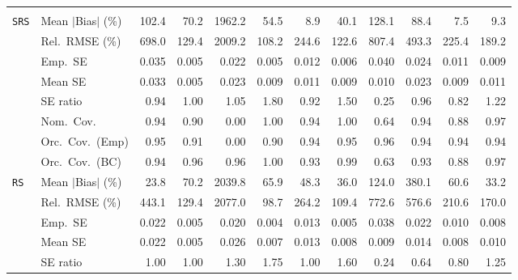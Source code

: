 \begin{landscape}
\begin{longtable}{llrrrrrrrrrr}
\addlinespace[2pt]
\multicolumn{12}{l}{\textbf{Interaction}} \\
\addlinespace[2pt]
\quad \texttt{SRS} & Mean $|$Bias$|$ (\%) & 102.4 & 70.2 & 1962.2 & 54.5 & \cellcolor{ranktwo}8.9 & 40.1 & 128.1 & 88.4 & \cellcolor{rankone}7.5 & \cellcolor{rankthree}9.3 \\
 & Rel.\ RMSE (\%) & 698.0 & \cellcolor{rankthree}129.4 & 2009.2 & \cellcolor{rankone}108.2 & 244.6 & \cellcolor{ranktwo}122.6 & 807.4 & 493.3 & 225.4 & 189.2 \\
 & Emp.\ SE & 0.035 & 0.005 & 0.022 & 0.005 & 0.012 & 0.006 & 0.040 & 0.024 & 0.011 & 0.009 \\
 & Mean SE & 0.033 & 0.005 & 0.023 & 0.009 & 0.011 & 0.009 & 0.010 & 0.023 & 0.009 & 0.011 \\
 & SE ratio & 0.94 & \cellcolor{rankone}1.00 & \cellcolor{rankthree}1.05 & 1.80 & 0.92 & 1.50 & 0.25 & \cellcolor{ranktwo}0.96 & 0.82 & 1.22 \\
 & Nom.\ Cov. & \cellcolor{rankone}0.94 & \cellcolor{rankthree}0.90 & 0.00 & \cellcolor{rankthree}1.00 & \cellcolor{rankone}0.94 & \cellcolor{rankthree}1.00 & 0.64 & \cellcolor{rankone}0.94 & 0.88 & \cellcolor{ranktwo}0.97 \\
 & Orc.\ Cov.\ (Emp) & \cellcolor{rankone}0.95 & \cellcolor{rankthree}0.91 & 0.00 & 0.90 & \cellcolor{ranktwo}0.94 & \cellcolor{rankone}0.95 & \cellcolor{ranktwo}0.96 & \cellcolor{ranktwo}0.94 & \cellcolor{ranktwo}0.94 & \cellcolor{ranktwo}0.94 \\
 & Orc.\ Cov.\ (BC) & \cellcolor{rankone}0.94 & \cellcolor{rankone}0.96 & \cellcolor{rankone}0.96 & 1.00 & \cellcolor{ranktwo}0.93 & \cellcolor{rankthree}0.99 & 0.63 & \cellcolor{ranktwo}0.93 & 0.88 & \cellcolor{ranktwo}0.97 \\
\addlinespace[2pt]
\quad \texttt{RS} & Mean $|$Bias$|$ (\%) & \cellcolor{rankone}23.8 & 70.2 & 2039.8 & 65.9 & 48.3 & \cellcolor{rankthree}36.0 & 124.0 & 380.1 & 60.6 & \cellcolor{ranktwo}33.2 \\
 & Rel.\ RMSE (\%) & 443.1 & \cellcolor{rankthree}129.4 & 2077.0 & \cellcolor{rankone}98.7 & 264.2 & \cellcolor{ranktwo}109.4 & 772.6 & 576.6 & 210.6 & 170.0 \\
 & Emp.\ SE & 0.022 & 0.005 & 0.020 & 0.004 & 0.013 & 0.005 & 0.038 & 0.022 & 0.010 & 0.008 \\
 & Mean SE & 0.022 & 0.005 & 0.026 & 0.007 & 0.013 & 0.008 & 0.009 & 0.014 & 0.008 & 0.010 \\
 & SE ratio & \cellcolor{rankone}1.00 & \cellcolor{rankone}1.00 & 1.30 & 1.75 & \cellcolor{rankone}1.00 & 1.60 & 0.24 & 0.64 & \cellcolor{ranktwo}0.80 & \cellcolor{rankthree}1.25 \\

\end{longtable}
\end{landscape}
